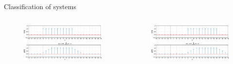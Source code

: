 \documentclass[aspectratio=169]{beamer}
\begin{document}
\begin{frame}[t]{Classification of systems}

\begin{columns}[t]
  \begin{column}{.45\linewidth}
  \begin{figure}
  \includegraphics[width=\textwidth]{img/timeinvar1.eps}
  \end{figure}
  \end{column}

  \begin{column}{.45\linewidth}
  \begin{figure}
  \includegraphics[width=\textwidth]{img/timeinvar2.eps}
  \end{figure}
  \end{column}
\end{columns}
\end{frame}
\end{document}
